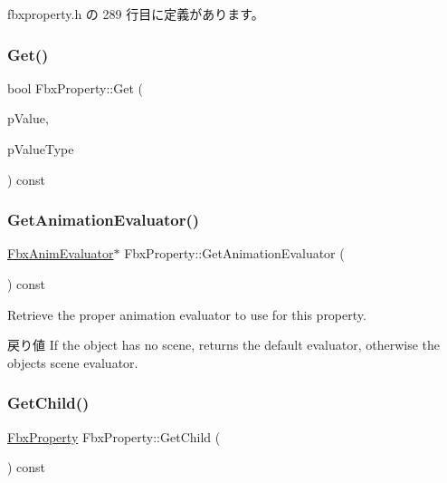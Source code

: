  fbxproperty.\+h の 289 行目に定義があります。

\mbox{\label{class_fbx_property_ac2b8fdea0758676644547365cea1e2ae}} 
\subsubsection{\texorpdfstring{Get()}{Get()}\hspace{0.1cm}{\footnotesize\ttfamily [2/2]}}
{\footnotesize\ttfamily bool Fbx\+Property\+::\+Get (\begin{DoxyParamCaption}\item[{void $\ast$}]{p\+Value,  }\item[{const \hyperlink{fbxpropertytypes_8h_a73913a5ddfb20e57c6f25e9e6784bd92}{E\+Fbx\+Type} \&}]{p\+Value\+Type }\end{DoxyParamCaption}) const\hspace{0.3cm}{\ttfamily [protected]}}

\mbox{\label{class_fbx_property_adcf2ea55a226994e1545b6179b33cbb2}} 
\subsubsection{\texorpdfstring{Get\+Animation\+Evaluator()}{GetAnimationEvaluator()}}
{\footnotesize\ttfamily \hyperlink{class_fbx_anim_evaluator}{Fbx\+Anim\+Evaluator}$\ast$ Fbx\+Property\+::\+Get\+Animation\+Evaluator (\begin{DoxyParamCaption}{ }\end{DoxyParamCaption}) const}

Retrieve the proper animation evaluator to use for this property. \begin{DoxyReturn}{戻り値}
If the object has no scene, returns the default evaluator, otherwise the object\textquotesingle{}s scene evaluator. 
\end{DoxyReturn}
\mbox{\label{class_fbx_property_a0b677f1fd948cfc645962a91b1ed928f}} 
\subsubsection{\texorpdfstring{Get\+Child()}{GetChild()}}
{\footnotesize\ttfamily \hyperlink{class_fbx_property}{Fbx\+Property} Fbx\+Property\+::\+Get\+Child (\begin{DoxyParamCaption}{ }\end{DoxyParamCaption}) const\hspace{0.3cm}{\ttfamily [inline]}}

